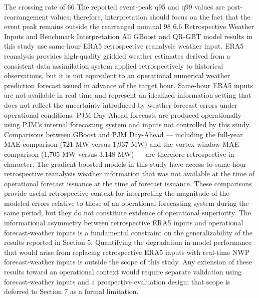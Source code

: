 The crossing rate of 66%
The reported event-peak q95 and q99 values are post-rearrangement values; therefore, interpretation should focus on the fact that the event peak remains outside the rearranged nominal 98%
6.6 Retrospective Weather Inputs and Benchmark Interpretation
All GBoost and QR-GBT model results in this study use same-hour ERA5 retrospective reanalysis weather input. ERA5 reanalysis provides high-quality gridded weather estimates derived from a consistent data assimilation system applied retrospectively to historical observations, but it is not equivalent to an operational numerical weather prediction forecast issued in advance of the target hour. Same-hour ERA5 inputs are not available in real time and represent an idealized information setting that does not reflect the uncertainty introduced by weather forecast errors under operational conditions.
PJM Day-Ahead forecasts are produced operationally using PJM's internal forecasting system and inputs not controlled by this study. Comparisons between GBoost and PJM Day-Ahead — including the full-year MAE comparison (721 MW versus 1,937 MW) and the vortex-window MAE comparison (1,705 MW versus 3,148 MW) — are therefore retrospective in character. The gradient boosted models in this study have access to same-hour retrospective reanalysis weather information that was not available at the time of operational forecast issuance at the time of forecast issuance. These comparisons provide useful retrospective context for interpreting the magnitude of the modeled errors relative to those of an operational forecasting system during the same period, but they do not constitute evidence of operational superiority.
The informational asymmetry between retrospective ERA5 inputs and operational forecast-weather inputs is a fundamental constraint on the generalizability of the results reported in Section 5. Quantifying the degradation in model performance that would arise from replacing retrospective ERA5 inputs with real-time NWP forecast-weather inputs is outside the scope of this study. Any extension of these results toward an operational context would require separate validation using forecast-weather inputs and a prospective evaluation design; that scope is deferred to Section 7 as a formal limitation.